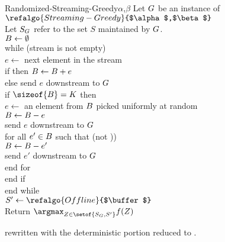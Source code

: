 \documentclass[oneside,letterpaper]{scrartcl} \usepackage{macros}
\begin{document}
\begin{figure}[t]
  \centering
  \begin{minipage}{13.2cm}
    \begin{framed}
      \begin{pseudocode}
        \begin{routine}{Randomized-Streaming-Greedy}{$\alpha$,$\beta$} Let $G$ be an instance of $\refalgo{Streaming-Greedy}{$\alpha$,$\beta$}$ \\
          Let $S_{G}$ refer to the set $S$ maintained by $G$. \\
          $B \gets \emptyset$ \\
          while (stream is not empty) \\
          \> $e \gets $ next element in the stream \\
          \> if  then $B
          \gets B + e$
          \\
          \> else send $e$ downstream to $G$
          \\
          \> if $\sizeof{\buffer} = \bufferlimit$ then \\
          \> \> $e \gets$ an element from $B$ picked uniformly
          at random \\
          \> \> $B \gets B - e$\\
          \> \> send $e$ downstream to $G$ \\
          \> \> for all $e' \in B$ such that (not ))\\
          \> \> \> $B \gets B - e'$\\
          \> \> \> send $e'$ downstream to $G$ \\
          \> \> end for \\
          \> end if\\
          end while\\
          $S' \gets \refalgo{Offline}{$\buffer$}$\\
          Return $\argmax_{Z \in \setof{S_{\instance},S'}} f(Z)$
        \end{routine}
      \end{pseudocode}
    \end{framed}
    \caption{ rewritten with the
      deterministic portion reduced to .}
  \end{minipage}
\end{figure}
\end{document}
